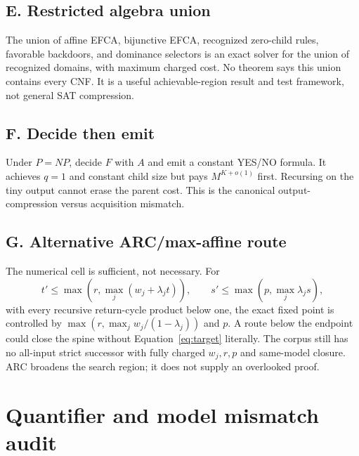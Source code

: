 \documentclass[11pt]{article}
\begin{document}
\subsection{E. Restricted algebra union}

The union of affine EFCA, bijunctive EFCA, recognized zero-child rules, favorable backdoors, and dominance selectors is an exact solver for the union of recognized domains, with maximum charged cost.  No theorem says this union contains every CNF.  It is a useful achievable-region result and test framework, not general SAT compression.

\subsection{F. Decide then emit}

Under $P=NP$, decide $F$ with $A$ and emit a constant YES/NO formula.  It achieves $q=1$ and constant child size but pays $M^{K+o(1)}$ first.  Recursing on the tiny output cannot erase the parent cost.  This is the canonical output-compression versus acquisition mismatch.

\subsection{G. Alternative ARC/max-affine route}

The numerical cell is sufficient, not necessary.  For
\[
  t'\le\max\left(r,\max_j(w_j+\lambda_jt)\right),\qquad
  s'\le\max\left(p,\max_j\lambda_js\right),
\]
with every recursive return-cycle product below one, the exact fixed point is controlled by $\max(r,\max_j w_j/(1-\lambda_j))$ and $p$.  A route below the endpoint could close the spine without Equation~\ref{eq:target} literally.  The corpus still has no all-input strict successor with fully charged $w_j,r,p$ and same-model closure.  ARC broadens the search region; it does not supply an overlooked proof.

\section{Quantifier and model mismatch audit}
\end{document}
